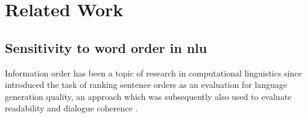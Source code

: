 \documentclass[letterpaper, 12pt]{report}
\begin{document}




% 







\section{Related Work}
\label{sec:mlm_related_work}


\subsection{Sensitivity to word order in \acrshort{nlu}}

Information order has been a topic of research in computational linguistics since \cite{barzilay-lee-2004-catching} introduced the task of ranking sentence orders
as an evaluation for language generation quality, an approach which was subsequently also used to evaluate readability and dialogue coherence \citep{barzilay-lapata-2008-modeling, laban-etal-2021-transformer}.
\end{document}
